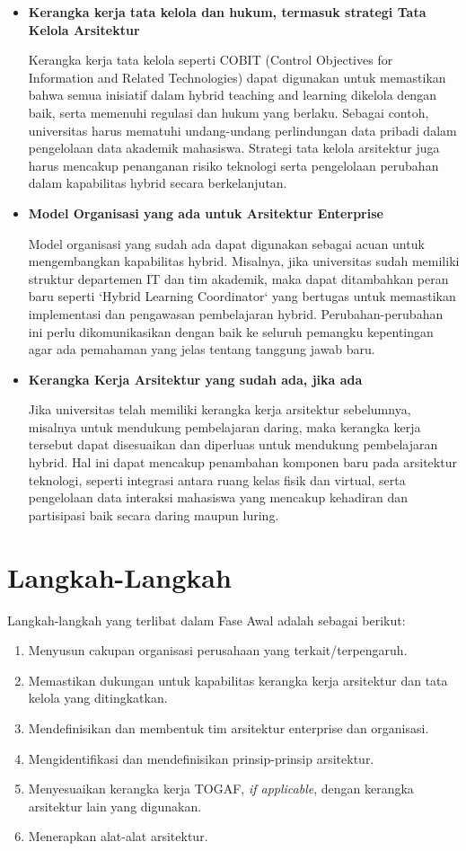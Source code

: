\begin{itemize}
	\item \textbf{Kerangka kerja tata kelola dan hukum, termasuk strategi Tata Kelola Arsitektur}
	
	Kerangka kerja tata kelola seperti COBIT (Control Objectives for Information and Related Technologies) dapat digunakan untuk memastikan bahwa semua inisiatif dalam hybrid teaching and learning dikelola dengan baik, serta memenuhi regulasi dan hukum yang berlaku. Sebagai contoh, universitas harus mematuhi undang-undang perlindungan data pribadi dalam pengelolaan data akademik mahasiswa. Strategi tata kelola arsitektur juga harus mencakup penanganan risiko teknologi serta pengelolaan perubahan dalam kapabilitas hybrid secara berkelanjutan.
	
	\item \textbf{Model Organisasi yang ada untuk Arsitektur Enterprise}
	
	Model organisasi yang sudah ada dapat digunakan sebagai acuan untuk mengembangkan kapabilitas hybrid. Misalnya, jika universitas sudah memiliki struktur departemen IT dan tim akademik, maka dapat ditambahkan peran baru seperti `Hybrid Learning Coordinator` yang bertugas untuk memastikan implementasi dan pengawasan pembelajaran hybrid. Perubahan-perubahan ini perlu dikomunikasikan dengan baik ke seluruh pemangku kepentingan agar ada pemahaman yang jelas tentang tanggung jawab baru.
	
	\item \textbf{Kerangka Kerja Arsitektur yang sudah ada, jika ada}
	
	Jika universitas telah memiliki kerangka kerja arsitektur sebelumnya, misalnya untuk mendukung pembelajaran daring, maka kerangka kerja tersebut dapat disesuaikan dan diperluas untuk mendukung pembelajaran hybrid. Hal ini dapat mencakup penambahan komponen baru pada arsitektur teknologi, seperti integrasi antara ruang kelas fisik dan virtual, serta pengelolaan data interaksi mahasiswa yang mencakup kehadiran dan partisipasi baik secara daring maupun luring.
\end{itemize}

\section{Langkah-Langkah}
Langkah-langkah yang terlibat dalam Fase Awal adalah sebagai berikut:

\begin{enumerate}
	\item Menyusun cakupan organisasi perusahaan yang terkait/terpengaruh.
	\item Memastikan dukungan untuk kapabilitas kerangka kerja arsitektur dan tata kelola yang ditingkatkan.
	\item Mendefinisikan dan membentuk tim arsitektur enterprise dan organisasi.
	\item Mengidentifikasi dan mendefinisikan prinsip-prinsip arsitektur.
	\item Menyesuaikan kerangka kerja TOGAF, \textit{if applicable}, dengan kerangka arsitektur lain yang digunakan.
	\item Menerapkan alat-alat arsitektur.
\end{enumerate}

